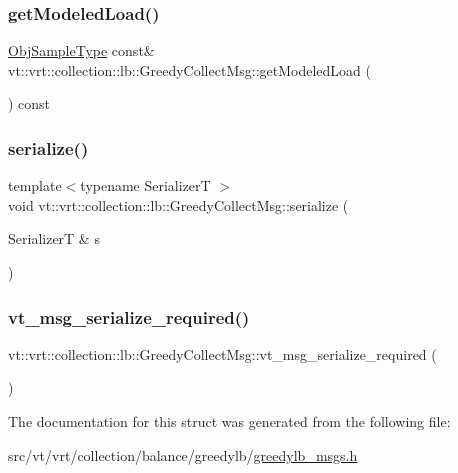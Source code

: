 \subsubsection{\texorpdfstring{get\+Modeled\+Load()}{getModeledLoad()}}
{\footnotesize\ttfamily \hyperlink{structvt_1_1vrt_1_1collection_1_1lb_1_1_greedy_l_b_types_a467f8a79d0785fca5fc95bd5c0f406b9}{Obj\+Sample\+Type} const\& vt\+::vrt\+::collection\+::lb\+::\+Greedy\+Collect\+Msg\+::get\+Modeled\+Load (\begin{DoxyParamCaption}{ }\end{DoxyParamCaption}) const\hspace{0.3cm}{\ttfamily [inline]}}

\mbox{\label{structvt_1_1vrt_1_1collection_1_1lb_1_1_greedy_collect_msg_ac0f5ca855ef36a56595e6ab019cf9487}} 
\subsubsection{\texorpdfstring{serialize()}{serialize()}}
{\footnotesize\ttfamily template$<$typename SerializerT $>$ \\
void vt\+::vrt\+::collection\+::lb\+::\+Greedy\+Collect\+Msg\+::serialize (\begin{DoxyParamCaption}\item[{SerializerT \&}]{s }\end{DoxyParamCaption})\hspace{0.3cm}{\ttfamily [inline]}}

\mbox{\label{structvt_1_1vrt_1_1collection_1_1lb_1_1_greedy_collect_msg_adf48bdb5542440ad7f1c958976f775da}} 
\subsubsection{\texorpdfstring{vt\+\_\+msg\+\_\+serialize\+\_\+required()}{vt\_msg\_serialize\_required()}}
{\footnotesize\ttfamily vt\+::vrt\+::collection\+::lb\+::\+Greedy\+Collect\+Msg\+::vt\+\_\+msg\+\_\+serialize\+\_\+required (\begin{DoxyParamCaption}{ }\end{DoxyParamCaption})}



The documentation for this struct was generated from the following file\+:\begin{DoxyCompactItemize}
\item 
src/vt/vrt/collection/balance/greedylb/\hyperlink{greedylb__msgs_8h}{greedylb\+\_\+msgs.\+h}\end{DoxyCompactItemize}
